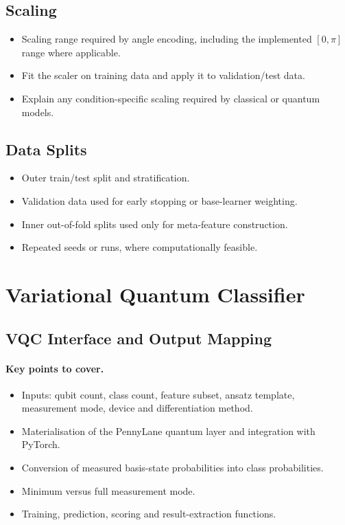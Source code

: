 \documentclass[]{UCD_CS_MSc_AAI_Report}
\newcommand{\sectionbrief}{\paragraph{Key points to cover.}}
\begin{document}
\subsection{Scaling}
\begin{itemize}
    \item Scaling range required by angle encoding, including the implemented $[0,\pi]$ range where applicable.
    \item Fit the scaler on training data and apply it to validation/test data.
    \item Explain any condition-specific scaling required by classical or quantum models.
\end{itemize}

\subsection{Data Splits}
\begin{itemize}
    \item Outer train/test split and stratification.
    \item Validation data used for early stopping or base-learner weighting.
    \item Inner out-of-fold splits used only for meta-feature construction.
    \item Repeated seeds or runs, where computationally feasible.
\end{itemize}

\section{Variational Quantum Classifier}
\label{sec:method-vqc}

\subsection{VQC Interface and Output Mapping}
\sectionbrief
\begin{itemize}
    \item Inputs: qubit count, class count, feature subset, ansatz template, measurement mode, device and differentiation method.
    \item Materialisation of the PennyLane quantum layer and integration with PyTorch.
    \item Conversion of measured basis-state probabilities into class probabilities.
    \item Minimum versus full measurement mode.
    \item Training, prediction, scoring and result-extraction functions.
\end{itemize}
\end{document}
